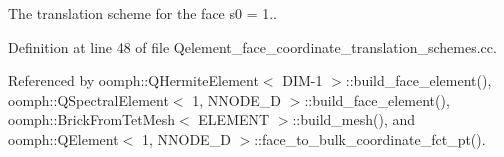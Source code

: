 The translation scheme for the face s0 = 1.. 



Definition at line 48 of file Qelement\+\_\+face\+\_\+coordinate\+\_\+translation\+\_\+schemes.\+cc.



Referenced by oomph\+::\+Q\+Hermite\+Element$<$ D\+I\+M-\/1 $>$\+::build\+\_\+face\+\_\+element(), oomph\+::\+Q\+Spectral\+Element$<$ 1, N\+N\+O\+D\+E\+\_\+D $>$\+::build\+\_\+face\+\_\+element(), oomph\+::\+Brick\+From\+Tet\+Mesh$<$ E\+L\+E\+M\+E\+N\+T $>$\+::build\+\_\+mesh(), and oomph\+::\+Q\+Element$<$ 1, N\+N\+O\+D\+E\+\_\+D $>$\+::face\+\_\+to\+\_\+bulk\+\_\+coordinate\+\_\+fct\+\_\+pt().

